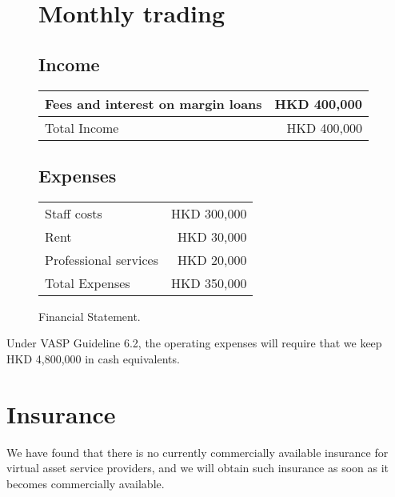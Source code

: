\begin{figure}[h]
  \centering
  \caption{Financial Statement.}
  \label{fig:financial_statement}
  
  \section*{Monthly trading }
  
  \subsection*{Income}
  \begin{tabular}{lr}
    Fees and interest on margin loans & HKD 400,000 \\
    \midrule
    Total Income & HKD 400,000 \\
  \end{tabular}
  
  \subsection*{Expenses}
  \begin{tabular}{lr}
    Staff costs & HKD 300,000 \\
    Rent & HKD 30,000 \\
    Professional services & HKD 20,000 \\
    \midrule
    Total Expenses & HKD 350,000 \\
  \end{tabular}
\end{figure}

Under VASP Guideline 6.2, the operating expenses will require that we keep
HKD 4,800,000 in cash equivalents.

\section{Insurance}
We have found that there is no currently commercially available
insurance for virtual asset service providers, and we will obtain such
insurance as soon as it becomes commercially available.

